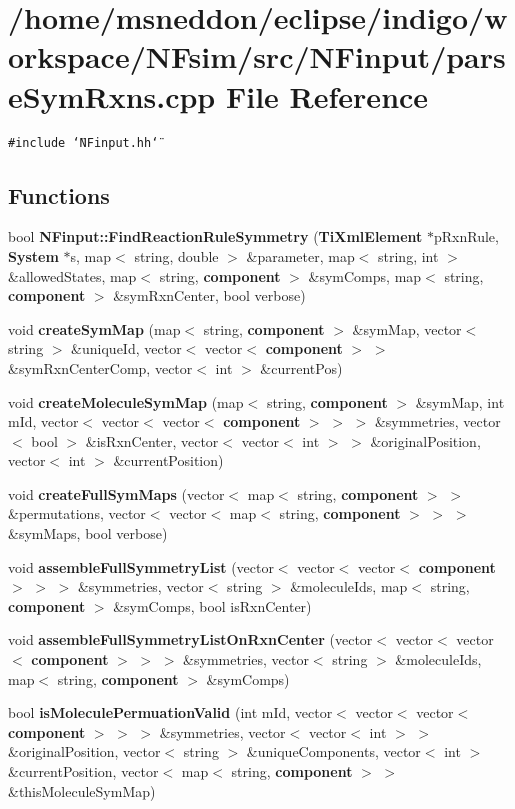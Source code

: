 \section{/home/msneddon/eclipse/indigo/workspace/NFsim/src/NFinput/parseSymRxns.cpp File Reference}
\label{parseSymRxns_8cpp}


{\tt \#include \char`\"{}NFinput.hh\char`\"{}}\par
\subsection*{Functions}
\begin{CompactItemize}
\item 
bool {\bf NFinput::FindReactionRuleSymmetry} ({\bf TiXmlElement} $\ast$pRxnRule, {\bf System} $\ast$s, map$<$ string, double $>$ \&parameter, map$<$ string, int $>$ \&allowedStates, map$<$ string, {\bf component} $>$ \&symComps, map$<$ string, {\bf component} $>$ \&symRxnCenter, bool verbose)
\item 
void {\bf createSymMap} (map$<$ string, {\bf component} $>$ \&symMap, vector$<$ string $>$ \&uniqueId, vector$<$ vector$<$ {\bf component} $>$ $>$ \&symRxnCenterComp, vector$<$ int $>$ \&currentPos)
\item 
void {\bf createMoleculeSymMap} (map$<$ string, {\bf component} $>$ \&symMap, int mId, vector$<$ vector$<$ vector$<$ {\bf component} $>$ $>$ $>$ \&symmetries, vector$<$ bool $>$ \&isRxnCenter, vector$<$ vector$<$ int $>$ $>$ \&originalPosition, vector$<$ int $>$ \&currentPosition)
\item 
void {\bf createFullSymMaps} (vector$<$ map$<$ string, {\bf component} $>$ $>$ \&permutations, vector$<$ vector$<$ map$<$ string, {\bf component} $>$ $>$ $>$ \&symMaps, bool verbose)
\item 
void {\bf assembleFullSymmetryList} (vector$<$ vector$<$ vector$<$ {\bf component} $>$ $>$ $>$ \&symmetries, vector$<$ string $>$ \&moleculeIds, map$<$ string, {\bf component} $>$ \&symComps, bool isRxnCenter)
\item 
void {\bf assembleFullSymmetryListOnRxnCenter} (vector$<$ vector$<$ vector$<$ {\bf component} $>$ $>$ $>$ \&symmetries, vector$<$ string $>$ \&moleculeIds, map$<$ string, {\bf component} $>$ \&symComps)
\item 
bool {\bf isMoleculePermuationValid} (int mId, vector$<$ vector$<$ vector$<$ {\bf component} $>$ $>$ $>$ \&symmetries, vector$<$ vector$<$ int $>$ $>$ \&originalPosition, vector$<$ string $>$ \&uniqueComponents, vector$<$ int $>$ \&currentPosition, vector$<$ map$<$ string, {\bf component} $>$ $>$ \&thisMoleculeSymMap)

\end{CompactItemize}

